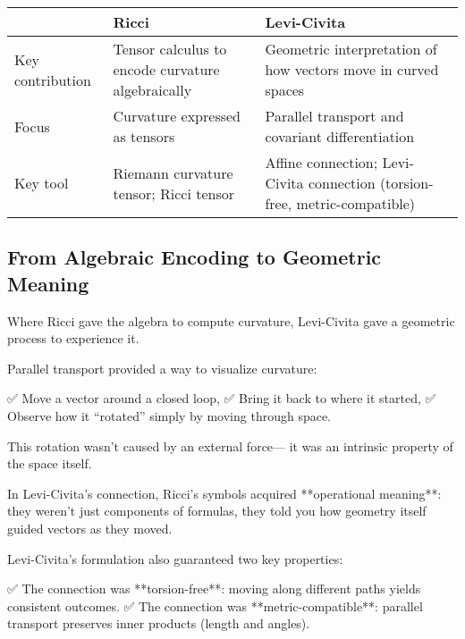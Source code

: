 \bigskip

\begin{tcolorbox}[colback=gray!5!white, colframe=black, title=\textbf{Sidebar: The Shift from Ricci to Levi-Civita}, fonttitle=\bfseries, arc=1.5mm, boxrule=0.4pt]

\begin{tabular}{>{\raggedright}p{4cm} >{\raggedright}p{5.5cm} >{\raggedright\arraybackslash}p{5.5cm}}
 & \textbf{Ricci} & \textbf{Levi-Civita} \\
\midrule
Key contribution & Tensor calculus to encode curvature algebraically & Geometric interpretation of how vectors move in curved spaces \\
Focus & Curvature expressed as tensors & Parallel transport and covariant differentiation \\
Key tool & Riemann curvature tensor; Ricci tensor & Affine connection; Levi-Civita connection (torsion-free, metric-compatible)
\end{tabular}

\end{tcolorbox}

\bigskip

\subsection*{From Algebraic Encoding to Geometric Meaning}

Where Ricci gave the algebra to compute curvature,  
Levi-Civita gave a geometric process to experience it.

Parallel transport provided a way to visualize curvature:

✅ Move a vector around a closed loop,  
✅ Bring it back to where it started,  
✅ Observe how it “rotated” simply by moving through space.

This rotation wasn’t caused by an external force—  
it was an intrinsic property of the space itself.

\bigskip

In Levi-Civita’s connection, Ricci’s symbols acquired **operational meaning**:  
they weren’t just components of formulas,  
they told you how geometry itself guided vectors as they moved.

Levi-Civita’s formulation also guaranteed two key properties:

✅ The connection was **torsion-free**: moving along different paths yields consistent outcomes.  
✅ The connection was **metric-compatible**: parallel transport preserves inner products (length and angles).

